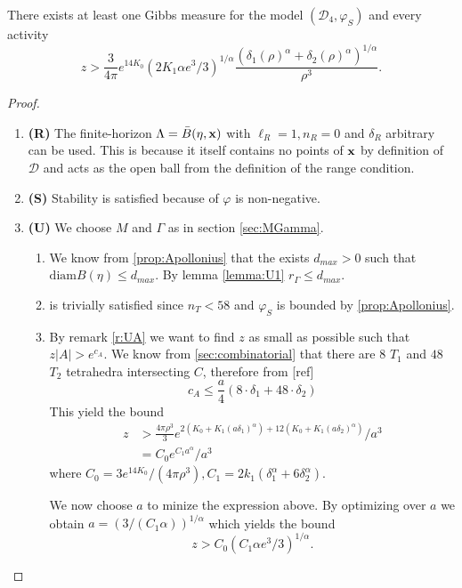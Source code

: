 \begin{proposition}\label{prop:E1}
	There exists at least one Gibbs measure for the model $(\mathcal D_4,\varphi_S)$ and every activity 
	$$z> \frac{3}{4\pi}e^{14 K_0}   (2K_1 \alpha e^3/3)^{1/\alpha} \frac{(\delta_1(\rho)^\alpha + \delta_2(\rho)^\alpha)^{1/\alpha}}{\rho^3}.$$
\end{proposition}
\begin{proof}
\begin{enumerate}[]
	\item \textbf{(R)} The finite-horizon $\Lambda = \bar B(\eta,{\mathbf{x}})$ with $\ell_R = 1, n_R = 0$ and $\delta_R$ arbitrary can be used. This is because it itself contains no points of ${\mathbf{x}}$ by definition of $\mathcal D$ and acts as the open ball from the definition of the range condition.
	\item \textbf{(S)} Stability is satisfied because of $\varphi$ is non-negative.
	\item \textbf{(U)} We choose $M$ and $\Gamma$ as in section \ref{sec:MGamma}.
		\begin{enumerate}[(U1)]
			\item We know from \ref{prop:Apollonius} that the exists $d_{max}>0$ such that $\text{diam}B(\eta)\leq d_{max}$. By lemma \ref{lemma:U1} $r_\Gamma\leq d_{max}.$
			\item is trivially satisfied since $n_T < 58$ and $\varphi_S$ is bounded by \ref{prop:Apollonius}.
			\item By remark \ref{r:UA} we want to find $z$ as small as possible such that $z|A|>e^{c_A}.$ We know from \ref{sec:combinatorial} that there are $8$ $T_1$ and $48$ $T_2$ tetrahedra intersecting $C$, therefore from [ref]
				$$c_A \leq \frac a4 (8\cdot \delta_1 + 48\cdot \delta_2 )$$
				This yield the bound
				\begin{align*}z &> \frac{4\pi\rho^3}{3} e^{2(K_0 + K_1 (a\delta_1)^\alpha) + 12(K_0 + K_1(a \delta_2)^\alpha)} / a^3  \\
					&= C_0 e^{C_1 a^\alpha} / a^3  
				\end{align*}
				where $C_0 = 3e^{14K_0}/(4\pi \rho^3),  C_1 = 2k_1(\delta_1^\alpha + 6 \delta_2^\alpha)$.

				We now choose $a$ to minize the expression above. By optimizing over $a$ we obtain $a=(3/(C_1 \alpha))^{1/\alpha}$ which yields the bound 
				$$z> C_0(C_1 \alpha e^3/ 3 )^{1/\alpha}.$$
		\end{enumerate}
\end{enumerate}
\end{proof}



